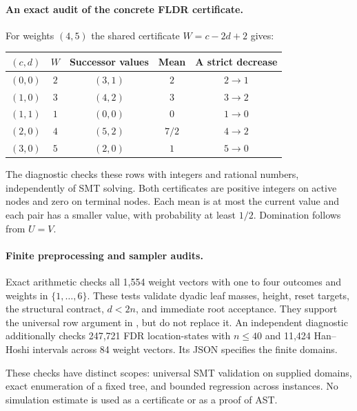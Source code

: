 \paragraph{An exact audit of the concrete FLDR certificate.}
For weights $(4,5)$ the shared certificate $W=c-2d+2$ gives:
\begin{center}
\begin{tabular}{@{}ccccc@{}}
\toprule
$(c,d)$ & $W$ & Successor values & Mean & A strict decrease\\
\midrule
$(0,0)$ & $2$ & $(3,1)$ & $2$ & $2\to1$\\
$(1,0)$ & $3$ & $(4,2)$ & $3$ & $3\to2$\\
$(1,1)$ & $1$ & $(0,0)$ & $0$ & $1\to0$\\
$(2,0)$ & $4$ & $(5,2)$ & $7/2$ & $4\to2$\\
$(3,0)$ & $5$ & $(2,0)$ & $1$ & $5\to0$\\
\bottomrule
\end{tabular}
\end{center}
The diagnostic checks these rows with integers and rational numbers,
independently of SMT solving. Both certificates are positive integers on
active nodes and zero on terminal nodes. Each mean is at most the current
value and each pair has a smaller value, with probability at least $1/2$.
Domination follows from $U=V$.

\paragraph{Finite preprocessing and sampler audits.}
Exact arithmetic checks all 1,554 weight vectors with one to four outcomes
and weights in $\{1,\ldots,6\}$. These tests validate dyadic leaf masses,
height, reset targets, the structural contract, $d<2n$, and immediate
root acceptance. They support the universal row argument in
, but do not replace it. An independent diagnostic
additionally checks 247,721 FDR location-states with $n\leq40$ and
11,424 Han--Hoshi intervals across 84 weight vectors. Its JSON specifies
the finite domains.

These checks have distinct scopes: universal SMT validation on supplied
domains, exact enumeration of a fixed tree, and bounded regression across
instances. No simulation estimate is used as a certificate or as a proof
of AST.
